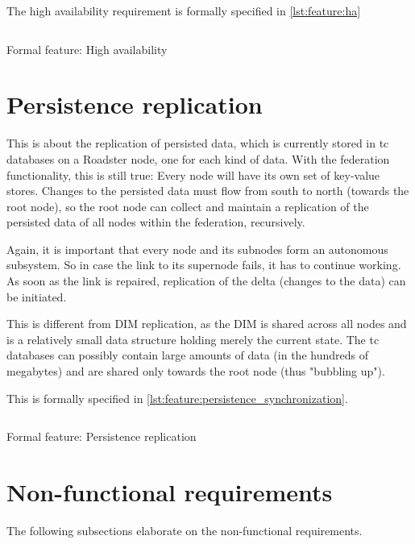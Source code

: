 The high availability requirement is formally specified in \autoref{lst:feature:ha}

\begin{listing}
	\inputminted{Gherkin}{listings/features/high_availability.feature}
	\caption{Formal feature: High availability}
	\label{lst:feature:ha}
\end{listing}

\section{Persistence replication}
This is about the replication of persisted data, which is currently stored
in \gls{tc} databases on a Roadster node, one for each kind of data. With the federation functionality, this is
still true: Every node will have its own set of key-value stores. Changes to the persisted
data must flow from south to north (towards the root node), so the root
node can collect and maintain a replication of the persisted data of all
nodes within the federation, recursively.

Again, it is important that every node and its subnodes form an autonomous subsystem. So
in case the link to its supernode fails, it has to continue working. As soon as
the link is repaired, replication of the delta (changes to the data) can
be initiated.

This is different from \gls{DIM} replication, as the DIM is shared across
all nodes and is a relatively small data structure holding merely the current state. The \gls{tc} databases
can possibly contain large amounts of data (in the hundreds of megabytes) and
are shared only towards the root node (thus "bubbling up").

This is formally specified in \autoref{lst:feature:persistence_synchronization}.

\begin{listing}
	\inputminted{Gherkin}{listings/features/persistence_synchronization.feature}
	\caption{Formal feature: Persistence replication}
	\label{lst:feature:persistence_synchronization}
\end{listing}

\section{Non-functional requirements}\label{sec:nfr}
The following subsections elaborate on the non-functional requirements.

